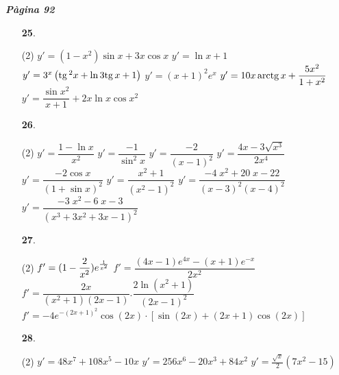\documentclass[a4paper, pdf, twoside]{book}
\begin{document}
{\textbf{\em Pàgina 92}} \hrulefill
\begin{enumerate}
\vspace{0.25cm}



 \item[\fontfamily{phv}\selectfont\color{blue}\textbf{25}. ]  \scalebox{0.6}{\simbolclau } 
 \begin{tasks}[column-sep=1em, item-indent=1.3333em](2)
	 \task $y'=(1-x^2)\sin x+3x\cos x$
	 \task $y'=\ln x +1$
	 \task $y'=3^x \left ( \mathrm{tg}\, ^2 x + \ln 3 \mathrm{tg}\, x + 1 \right )$
	 \task $y'=(x+1)^2 e^x$
	 \task $y'=10x\,\mathrm{arctg}\, x + \dfrac {5x^2}{1+x^2}$
	 \task $y'=\dfrac {\sin x^2}{x+1} + 2x\ln x\cos x^2$
\end{tasks}
 \end{enumerate}
\begin{enumerate}
\vspace{0.25cm}



 \item[\fontfamily{phv}\selectfont\color{blue}\textbf{26}. ]  \scalebox{0.6}{\simbolclau } 
 \begin{tasks}[column-sep=1em, item-indent=1.3333em](2)
	 \task $y'=\dfrac {1 - \ln x }{x^2}$
	 \task $y'=\dfrac {-1}{\sin ^2 x}$
	 \task $y'=\dfrac {-2}{(x-1)^2}$
	 \task $y'=\dfrac {4x-3\sqrt {x^3}}{2x^4}$
	 \task $y'=\dfrac {-2\cos x}{(1+\sin x)^2}$
	 \task $y'=\dfrac {x^2+1}{(x^2-1)^2}$
	 \task $y'=\dfrac {-4 \; x^{2} + 20 \; x - 22}{(x-3)^2 (x-4)^2}$
	 \task $y'=\dfrac {-3 \; x^{2} - 6 \; x - 3}{(x^3+3x^2+3x-1)^2}$
\end{tasks}
\vspace{0.25cm}



 \item[\fontfamily{phv}\selectfont\color{blue}\textbf{27}. ] 
 \begin{tasks}[column-sep=1em, item-indent=1.3333em](2)
	 \task* $f'=(1-\dfrac {2}{x^2}) e^{1\over x^2}$
	 \task* $f'=\dfrac {(4x-1)e^{4x}-(x+1)e^{-x}}{2x^2}$
	 \task* $f'=\dfrac {2x}{(x^2+1)(2x-1)}.\dfrac {2\ln (x^2+1)}{(2x-1)^2}$
	 \task* $f'=-4 e^{-(2x+1)^2} \cos (2x) \cdot \left [ \sin (2x)+(2x+1) \cos (2x) \right ]$ 
\end{tasks}
\vspace{0.25cm}



 \item[\fontfamily{phv}\selectfont\color{blue}\textbf{28}. ] 
 \begin{tasks}[column-sep=1em, item-indent=1.3333em](2)
	 \task $y'=48x^7+108 x^5-10x$
	 \task $y'=256x^6-20x^3+84x^2$
	 \task* $y'=\frac {\sqrt {x}}{2} \left (7x^2-15 \right )$
\end{tasks}
 \end{enumerate}
\vspace{0.3cm}
\end{document}
